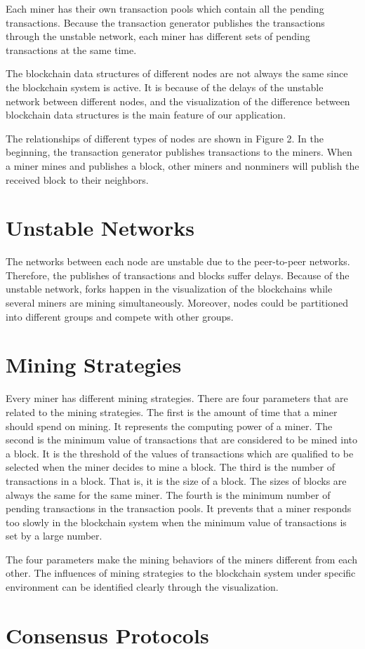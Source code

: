 Each miner has their own transaction pools which contain all the pending transactions. Because the transaction generator publishes the transactions through the unstable network, each miner has different sets of pending transactions at the same time.

The blockchain data structures of different nodes are not always the same since the blockchain system is active. It is because of the delays of the unstable network between different nodes, and the visualization of the difference between blockchain data structures is the main feature of our application.

The relationships of different types of nodes are shown in Figure 2. In the beginning, the transaction generator publishes transactions to the miners. When a miner mines and publishes a block, other miners and nonminers will publish the received block to their neighbors.

\section{Unstable Networks}

The networks between each node are unstable due to the peer-to-peer networks. Therefore, the publishes of transactions and blocks suffer delays. Because of the unstable network, forks happen in the visualization of the blockchains while several miners are mining simultaneously. Moreover, nodes could be partitioned into different groups and compete with other groups.

\section{Mining Strategies}

Every miner has different mining strategies. There are four parameters that are related to the mining strategies. The first is the amount of time that a miner should spend on mining. It represents the computing power of a miner. The second is the minimum value of transactions that are considered to be mined into a block. It is the threshold of the values of transactions which are qualified to be selected when the miner decides to mine a block. The third is the number of transactions in a block. That is, it is the size of a block. The sizes of blocks are always the same for the same miner. The fourth is the minimum number of pending transactions in the transaction pools. It prevents that a miner responds too slowly in the blockchain system when the minimum value of transactions is set by a large number.

The four parameters make the mining behaviors of the miners different from each other. The influences of mining strategies to the blockchain system under specific environment can be identified clearly through the visualization.

\section{Consensus Protocols}
